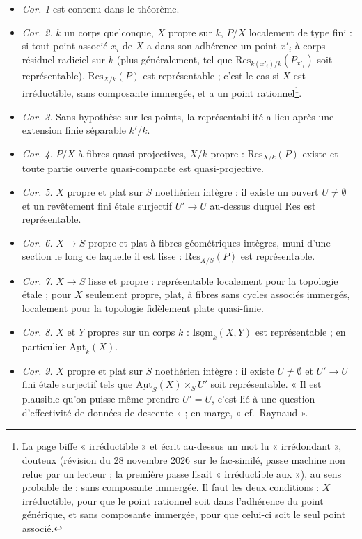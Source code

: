 \documentclass[11pt,a4paper]{article}
\begin{document}
\begin{itemize}
  \item \emph{Cor. 1} est contenu dans le théorème.
  \item \emph{Cor. 2.} $k$ un corps quelconque, $X$ propre sur $k$, $P/X$
  localement de type fini : si tout point associé $x_i$ de $X$ a dans son
  adhérence un point $x'_i$ à corps résiduel radiciel sur $k$ (plus
  généralement, tel que $\mathrm{Res}_{k(x'_i)/k}(P_{x'_i})$ soit représentable),
  $\mathrm{Res}_{X/k}(P)$ est représentable ; c'est le cas si $X$ est irréductible,
  sans composante immergée, et a un point rationnel\footnote{La page biffe
  « irréductible » et écrit au-dessus un mot lu « irrédondant », douteux (révision du 28 novembre 2026 sur le fac-similé, passe machine non relue par un lecteur ;
  la première passe lisait « irréductible aux »), au sens probable de : sans
  composante immergée. Il faut les deux conditions : $X$ irréductible, pour que
  le point rationnel soit dans l'adhérence du point générique, et sans
  composante immergée, pour que celui-ci soit le seul point associé.}.
  \item \emph{Cor. 3.} Sans hypothèse sur les points, la représentabilité a
  lieu après une extension finie séparable $k'/k$.
  \item \emph{Cor. 4.} $P/X$ à fibres quasi-projectives, $X/k$ propre :
  $\mathrm{Res}_{X/k}(P)$ existe et toute partie ouverte quasi-compacte est
  quasi-projective.
  \item \emph{Cor. 5.} $X$ propre et plat sur $S$ noethérien intègre : il
  existe un ouvert $U \neq \emptyset$ et un revêtement fini étale surjectif $U'
  \to U$ au-dessus duquel $\mathrm{Res}$ est représentable.
  \item \emph{Cor. 6.} $X \to S$ propre et plat à fibres géométriques
  intègres, muni d'une section le long de laquelle il est lisse :
  $\mathrm{Res}_{X/S}(P)$ est représentable.
  \item \emph{Cor. 7.} $X \to S$ lisse et propre : représentable localement
  pour la topologie étale ; pour $X$ seulement propre, plat, à fibres sans
  cycles associés immergés, localement pour la topologie fidèlement plate
  quasi-finie.
  \item \emph{Cor. 8.} $X$ et $Y$ propres sur un corps $k$ :
  $\underline{\mathrm{Isom}}_k(X,Y)$ est représentable ; en particulier
  $\underline{\mathrm{Aut}}_k(X)$.
  \item \emph{Cor. 9.} $X$ propre et plat sur $S$ noethérien intègre : il
  existe $U \neq \emptyset$ et $U' \to U$ fini étale surjectif tels que
  $\underline{\mathrm{Aut}}_S(X) \times_S U'$ soit représentable. « Il est
  plausible qu'on puisse même prendre $U' = U$, c'est lié à une question
  d'effectivité de données de descente » ; en marge, « cf.\ Raynaud ».
\end{itemize}
\end{document}
